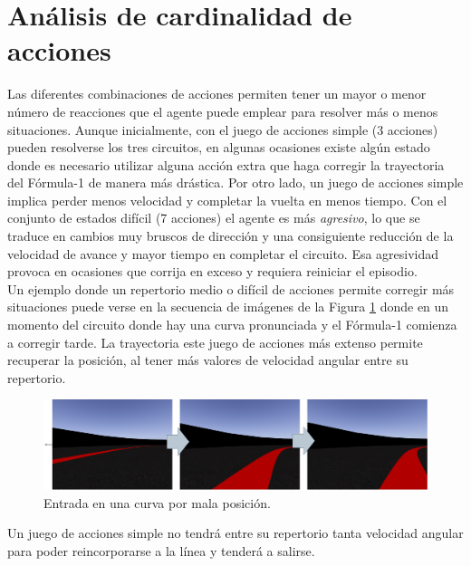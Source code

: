 \section{Análisis de cardinalidad de acciones}

Las diferentes combinaciones de acciones permiten tener un mayor o menor número de reacciones que el agente puede emplear para resolver más o menos situaciones. Aunque inicialmente, con el juego de acciones simple (3 acciones) pueden resolverse los tres circuitos, en algunas ocasiones existe algún estado donde es necesario utilizar alguna acción extra que haga corregir la trayectoria del Fórmula-1 de manera más drástica. Por otro lado, un juego de acciones simple implica perder menos velocidad y completar la vuelta en menos tiempo. Con el conjunto de estados difícil (7 acciones) el agente es más \textit{agresivo}, lo que se traduce en cambios muy bruscos de dirección y una consiguiente reducción de la velocidad de avance y mayor tiempo en completar el circuito. Esa agresividad provoca en ocasiones que corrija en exceso y requiera reiniciar el episodio.\\

Un ejemplo donde un repertorio medio o difícil de acciones permite corregir más situaciones puede verse en la secuencia de imágenes de la Figura \ref{fig:ataque-curva} donde en un momento del circuito donde hay una curva pronunciada y el Fórmula-1 comienza a corregir tarde. La trayectoria este juego de acciones más extenso permite recuperar la posición, al tener más valores de velocidad angular entre su repertorio.

\begin{figure}[ht!]
    \centering \includegraphics[width=1\columnwidth]{./figures/chapter_5/curva_pasada.png}
    \caption{Entrada en una curva por mala posición.}\label{fig:ataque-curva}
\end{figure}

Un juego de acciones simple no tendrá entre su repertorio tanta velocidad angular para poder reincorporarse a la línea y tenderá a salirse.\\

